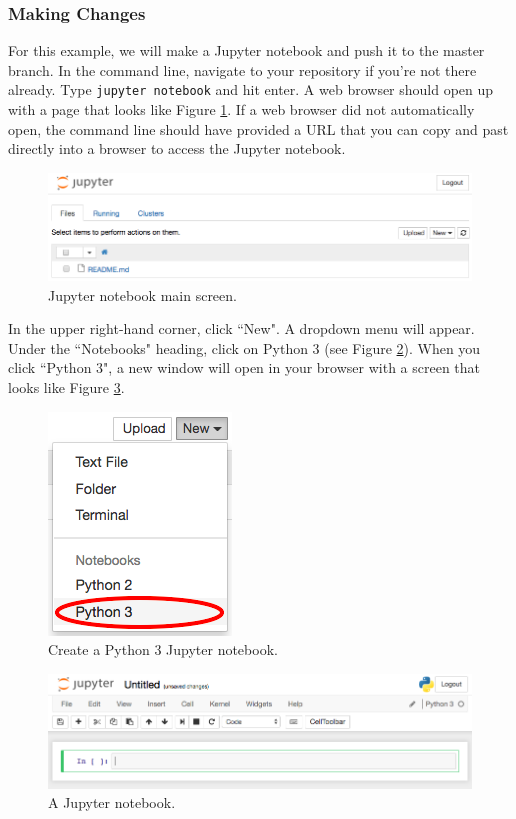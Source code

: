 \documentclass[11pt,a4paper]{article}
\begin{document}
\subsubsection{Making Changes}
For this example, we will make a Jupyter notebook and push it to the master branch.
In the command line, navigate to your repository if you're not there already.
Type \texttt{jupyter notebook} and hit enter.
A web browser should open up with a page that looks like Figure \ref{fig:jupyter-dir}.
If a web browser did not automatically open, the command line should have provided a URL that you can copy and past directly into a browser to access the Jupyter notebook.

\begin{figure}[h!]
\centering
\includegraphics[width=.6\textwidth]{figures/jupyter_dir.png}
\caption{Jupyter notebook main screen.}
\label{fig:jupyter-dir}
\end{figure}

In the upper right-hand corner, click ``New".
A dropdown menu will appear.
Under the ``Notebooks" heading, click on Python 3 (see Figure \ref{fig:jupyter-dropdown}).
When you click ``Python 3", a new window will open in your browser with a screen that looks like Figure \ref{fig:jupyter}.

\begin{figure}[h!]
\centering
\includegraphics[width=.2\textwidth]{figures/jupyter_dropdown.png}
\caption{Create a Python 3 Jupyter notebook.}
\label{fig:jupyter-dropdown}
\end{figure}

\begin{figure}[h!]
\centering
\includegraphics[width=.6\textwidth]{figures/jupyter.png}
\caption{A Jupyter notebook.}
\label{fig:jupyter}
\end{figure}
\end{document}
